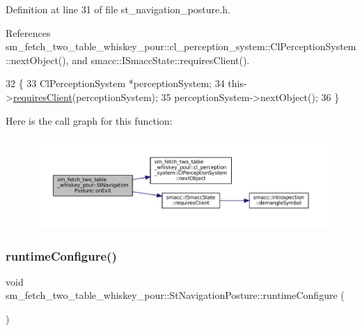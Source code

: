 Definition at line 31 of file st\+\_\+navigation\+\_\+posture.\+h.



References sm\+\_\+fetch\+\_\+two\+\_\+table\+\_\+whiskey\+\_\+pour\+::cl\+\_\+perception\+\_\+system\+::\+Cl\+Perception\+System\+::next\+Object(), and smacc\+::\+I\+Smacc\+State\+::requires\+Client().


\begin{DoxyCode}
32         \{
33             ClPerceptionSystem *perceptionSystem;
34             this->\hyperlink{classsmacc_1_1ISmaccState_a7f95c9f0a6ea2d6f18d1aec0519de4ac}{requiresClient}(perceptionSystem);
35             perceptionSystem->nextObject();
36         \}
\end{DoxyCode}
Here is the call graph for this function\+:
\nopagebreak
\begin{figure}[H]
\begin{center}
\leavevmode
\includegraphics[width=350pt]{structsm__fetch__two__table__whiskey__pour_1_1StNavigationPosture_a5e0e6613c360a4787eea61e57c9820f9_cgraph}
\end{center}
\end{figure}
\mbox{\label{structsm__fetch__two__table__whiskey__pour_1_1StNavigationPosture_ac9da503168185b9afe89d12235bb8bfb}} 
\subsubsection{\texorpdfstring{runtime\+Configure()}{runtimeConfigure()}}
{\footnotesize\ttfamily void sm\+\_\+fetch\+\_\+two\+\_\+table\+\_\+whiskey\+\_\+pour\+::\+St\+Navigation\+Posture\+::runtime\+Configure (\begin{DoxyParamCaption}{ }\end{DoxyParamCaption})\hspace{0.3cm}{\ttfamily [inline]}}



